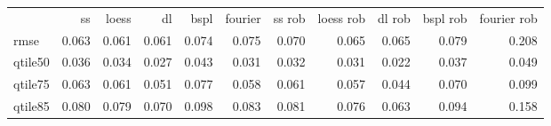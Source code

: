 \begin{tabular}{lrrrrrrrrrr}
 & ss & loess & dl & bspl & fourier & ss rob & loess rob & dl rob & bspl rob & fourier rob \\
rmse & {\cellcolor[HTML]{EEEEEE}} \color[HTML]{000000} 0.063 & {\cellcolor[HTML]{F1F1F1}} \color[HTML]{000000} 0.061 & {\cellcolor[HTML]{F1F1F1}} \color[HTML]{000000} 0.061 & {\cellcolor[HTML]{DCDCDC}} \color[HTML]{000000} 0.074 & {\cellcolor[HTML]{DADADA}} \color[HTML]{000000} 0.075 & {\cellcolor[HTML]{E2E2E2}} \color[HTML]{000000} 0.070 & {\cellcolor[HTML]{EBEBEB}} \color[HTML]{000000} 0.065 & {\cellcolor[HTML]{EBEBEB}} \color[HTML]{000000} 0.065 & {\cellcolor[HTML]{D3D3D3}} \color[HTML]{000000} 0.079 & {\cellcolor[HTML]{000000}} \color[HTML]{F1F1F1} 0.208 \\
qtile50 & {\cellcolor[HTML]{747474}} \color[HTML]{F1F1F1} 0.036 & {\cellcolor[HTML]{868686}} \color[HTML]{F1F1F1} 0.034 & {\cellcolor[HTML]{C4C4C4}} \color[HTML]{000000} 0.027 & {\cellcolor[HTML]{353535}} \color[HTML]{F1F1F1} 0.043 & {\cellcolor[HTML]{A0A0A0}} \color[HTML]{F1F1F1} 0.031 & {\cellcolor[HTML]{989898}} \color[HTML]{F1F1F1} 0.032 & {\cellcolor[HTML]{A0A0A0}} \color[HTML]{F1F1F1} 0.031 & {\cellcolor[HTML]{F1F1F1}} \color[HTML]{000000} 0.022 & {\cellcolor[HTML]{6B6B6B}} \color[HTML]{F1F1F1} 0.037 & {\cellcolor[HTML]{000000}} \color[HTML]{F1F1F1} 0.049 \\
qtile75 & {\cellcolor[HTML]{9E9E9E}} \color[HTML]{F1F1F1} 0.063 & {\cellcolor[HTML]{A6A6A6}} \color[HTML]{F1F1F1} 0.061 & {\cellcolor[HTML]{D2D2D2}} \color[HTML]{000000} 0.051 & {\cellcolor[HTML]{606060}} \color[HTML]{F1F1F1} 0.077 & {\cellcolor[HTML]{B3B3B3}} \color[HTML]{000000} 0.058 & {\cellcolor[HTML]{A6A6A6}} \color[HTML]{F1F1F1} 0.061 & {\cellcolor[HTML]{B8B8B8}} \color[HTML]{000000} 0.057 & {\cellcolor[HTML]{F1F1F1}} \color[HTML]{000000} 0.044 & {\cellcolor[HTML]{7E7E7E}} \color[HTML]{F1F1F1} 0.070 & {\cellcolor[HTML]{000000}} \color[HTML]{F1F1F1} 0.099 \\
qtile85 & {\cellcolor[HTML]{C6C6C6}} \color[HTML]{000000} 0.080 & {\cellcolor[HTML]{C8C8C8}} \color[HTML]{000000} 0.079 & {\cellcolor[HTML]{E0E0E0}} \color[HTML]{000000} 0.070 & {\cellcolor[HTML]{989898}} \color[HTML]{F1F1F1} 0.098 & {\cellcolor[HTML]{BFBFBF}} \color[HTML]{000000} 0.083 & {\cellcolor[HTML]{C3C3C3}} \color[HTML]{000000} 0.081 & {\cellcolor[HTML]{D0D0D0}} \color[HTML]{000000} 0.076 & {\cellcolor[HTML]{F1F1F1}} \color[HTML]{000000} 0.063 & {\cellcolor[HTML]{A2A2A2}} \color[HTML]{F1F1F1} 0.094 & {\cellcolor[HTML]{000000}} \color[HTML]{F1F1F1} 0.158 \\

\end{tabular}
